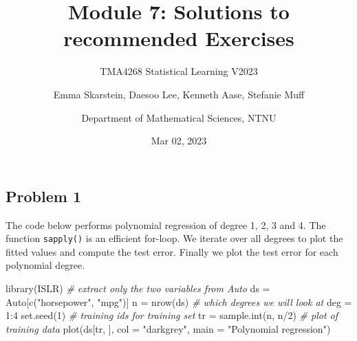 \documentclass[
]{article}
\title{Module 7: Solutions to recommended Exercises}
\subtitle{TMA4268 Statistical Learning V2023}
\author{Emma Skarstein, Daesoo Lee, Kenneth Aase, Stefanie
Muff \and Department of Mathematical Sciences, NTNU}
\date{Mar 02, 2023}
\newenvironment{Shaded}{\begin{snugshade}}{\end{snugshade}}
\newcommand{\AttributeTok}[1]{\textcolor[rgb]{0.77,0.63,0.00}{#1}}
\newcommand{\CommentTok}[1]{\textcolor[rgb]{0.56,0.35,0.01}{\textit{#1}}}
\newcommand{\DecValTok}[1]{\textcolor[rgb]{0.00,0.00,0.81}{#1}}
\newcommand{\FunctionTok}[1]{\textcolor[rgb]{0.00,0.00,0.00}{#1}}
\newcommand{\NormalTok}[1]{#1}
\newcommand{\OtherTok}[1]{\textcolor[rgb]{0.56,0.35,0.01}{#1}}
\newcommand{\SpecialCharTok}[1]{\textcolor[rgb]{0.00,0.00,0.00}{#1}}
\newcommand{\StringTok}[1]{\textcolor[rgb]{0.31,0.60,0.02}{#1}}
\begin{document}
\maketitle

\hypertarget{problem-1}{%
\subsection{Problem 1}\label{problem-1}}

The code below performs polynomial regression of degree 1, 2, 3 and 4.
The function \texttt{sapply()} is an efficient for-loop. We iterate over
all degrees to plot the fitted values and compute the test error.
Finally we plot the test error for each polynomial degree.

\begin{Shaded}
\begin{Highlighting}[]
\FunctionTok{library}\NormalTok{(ISLR)}
\CommentTok{\# extract only the two variables from Auto}
\NormalTok{ds }\OtherTok{=}\NormalTok{ Auto[}\FunctionTok{c}\NormalTok{(}\StringTok{"horsepower"}\NormalTok{, }\StringTok{"mpg"}\NormalTok{)]}
\NormalTok{n }\OtherTok{=} \FunctionTok{nrow}\NormalTok{(ds)}
\CommentTok{\# which degrees we will look at}
\NormalTok{deg }\OtherTok{=} \DecValTok{1}\SpecialCharTok{:}\DecValTok{4}
\FunctionTok{set.seed}\NormalTok{(}\DecValTok{1}\NormalTok{)}
\CommentTok{\# training ids for training set}
\NormalTok{tr }\OtherTok{=} \FunctionTok{sample.int}\NormalTok{(n, n}\SpecialCharTok{/}\DecValTok{2}\NormalTok{)}
\CommentTok{\# plot of training data}
\FunctionTok{plot}\NormalTok{(ds[tr, ], }\AttributeTok{col =} \StringTok{"darkgrey"}\NormalTok{, }\AttributeTok{main =} \StringTok{"Polynomial regression"}\NormalTok{)}


\end{Highlighting}
\end{Shaded}
\end{document}
